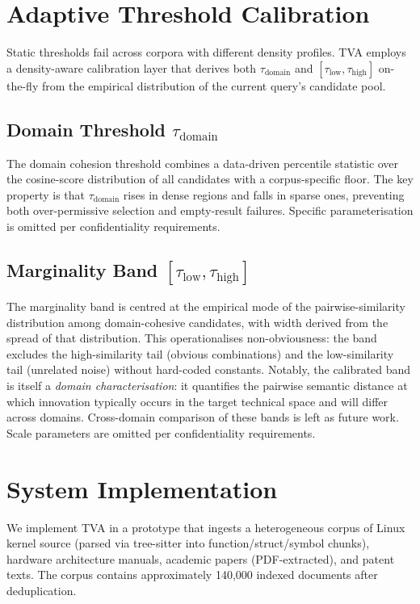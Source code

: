 \documentclass[11pt,twocolumn]{article}
\newcommand{\taudomain}{\tau_{\mathrm{domain}}}
\newcommand{\taulow}{\tau_{\mathrm{low}}}
\newcommand{\tauhigh}{\tau_{\mathrm{high}}}
\begin{document}
\section{Adaptive Threshold Calibration}
\label{sec:calibration}

Static thresholds fail across corpora with different density profiles.
TVA employs a density-aware calibration layer that derives both
$\taudomain$ and $[\taulow, \tauhigh]$ on-the-fly from the empirical
distribution of the current query's candidate pool.

\subsection{Domain Threshold $\taudomain$}

The domain cohesion threshold combines a data-driven percentile
statistic over the cosine-score distribution of all candidates with
a corpus-specific floor.  The key property is that $\taudomain$
rises in dense regions and falls in sparse ones, preventing both
over-permissive selection and empty-result failures.
Specific parameterisation is omitted per confidentiality requirements.

\subsection{Marginality Band $[\taulow, \tauhigh]$}

The marginality band is centred at the empirical mode of the
pairwise-similarity distribution among domain-cohesive candidates,
with width derived from the spread of that distribution.  This
operationalises non-obviousness: the band excludes the
high-similarity tail (obvious combinations) and the low-similarity
tail (unrelated noise) without hard-coded constants.
Notably, the calibrated band is itself a \emph{domain characterisation}:
it quantifies the pairwise semantic distance at which innovation
typically occurs in the target technical space and will differ across
domains.  Cross-domain comparison of these bands is left as future work.
Scale parameters are omitted per confidentiality requirements.

\section{System Implementation}
\label{sec:impl}

We implement TVA in a prototype that ingests a heterogeneous corpus of
Linux kernel source (parsed via tree-sitter into
function/struct/symbol chunks), hardware architecture manuals, academic
papers (PDF-extracted), and patent texts.  The corpus contains
approximately 140,000 indexed documents after deduplication.
\end{document}

